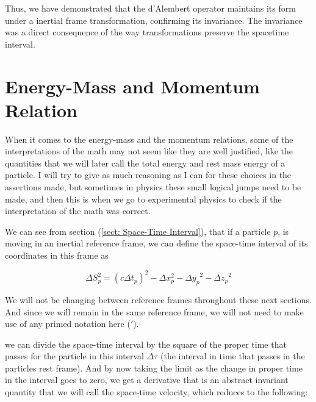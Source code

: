 
Thus, we have demonstrated that the d'Alembert operator maintains its form under a inertial frame transformation, confirming its invariance.
The invariance was a direct consequence of the way transformations preserve the spacetime interval.

\section{Energy-Mass and Momentum Relation} \label{sect: Energy-Mass and Momentum Relation}

When it comes to the energy-mass and the momentum relations, some of the interpretations of the math may not seem like they are well justified, like the quantities that we will later call the total energy and rest mass energy of a particle.
I will try to give as much reasoning as I can for these choices in the assertions made, but sometimes in physics these small logical jumps need to be made, and then this is when we go to experimental physics to check if the interpretation of the math was correct.

We can see from section (\ref{sect: Space-Time Interval}), that if a particle $p$, is moving in an inertial reference frame, we can define the space-time interval of its coordinates in this frame as

\begin{equation}
	\Delta S_p^2 = (c\Delta {t}_p)^2-\Delta x_p^2-{\Delta y_p}^2-{\Delta z_p}^2
\end{equation}

We will not be changing between reference frames throughout these next sections.
And since we will remain in the same reference frame, we will not need to make use of any primed notation here ($'$).

we can divide the space-time interval by the square of the proper time that passes for the particle in this interval ${\Delta\tau}$ (the interval in time that passes in the particles rest frame).
And by now taking the limit as the change in proper time in the interval goes to zero, we get a derivative that is an abstract invariant quantity that we will call the space-time velocity, which reduces to the following:

